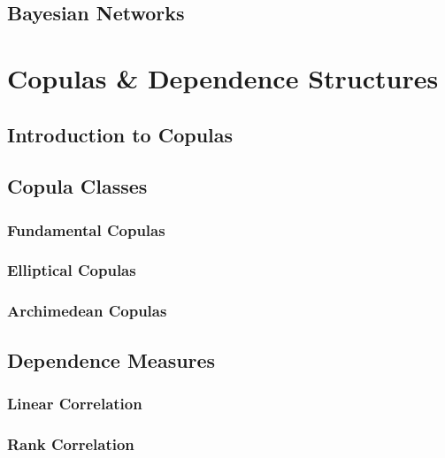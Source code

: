 \documentclass[11pt, twoside]{article}
\numberwithin{equation}{section}
\numberwithin{table}{section}
\numberwithin{figure}{section}
\begin{document}
\subsection{Bayesian Networks} \label{ssec:bayesian_networks}

\newpage
\thispagestyle{empty}
\cleardoublepage

\thispagestyle{plain}
\section{Copulas \& Dependence Structures} \label{sec:copulas_and_dependence_structures}

\subsection{Introduction to Copulas} \label{ssec:intro_to_copulas}

\subsection{Copula Classes} \label{ssec:copula_classes}

\subsubsection{Fundamental Copulas} \label{sssec:fundamental_copulas}

\subsubsection{Elliptical Copulas} \label{sssec:elliptical_copulas}

\subsubsection{Archimedean Copulas} \label{sssec:archimedean_copulas}

\subsection{Dependence Measures} \label{ssec:dependence_measures}

\subsubsection{Linear Correlation} \label{sssec:linear_correlation}

\subsubsection{Rank Correlation} \label{sssec:rank_correlation}

\end{document}
